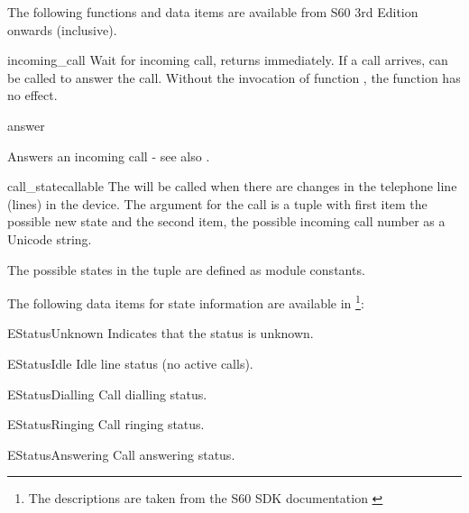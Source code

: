\begin{notice}[note]
The following functions and data items are available from S60 3rd Edition 
onwards (inclusive).
\end{notice}

\begin{funcdesc}{incoming_call}{}
Wait for incoming call, returns immediately. If a call arrives,  
can be called to answer the call. Without the invocation of function 
, the function  has no effect.
\end{funcdesc}

\begin{funcdesc}{answer}{}

Answers an incoming call - see also . 

\end{funcdesc}

\begin{funcdesc}{call_state}{callable}
The  will be called when there are changes in the telephone line 
(lines) in the device. The argument for the call is a tuple with first item the 
possible new state and the second item, the possible incoming call number as a 
Unicode string.

The possible states in the tuple are defined as  module 
constants.
\end{funcdesc}

The following data items for state information are available in 
\footnote{The descriptions are taken from the S60 SDK 
documentation \cite{S60Doc}}:

\begin{datadesc}{EStatusUnknown}
Indicates that the status is unknown.
\end{datadesc}

\begin{datadesc}{EStatusIdle}
Idle line status (no active calls).
\end{datadesc}

\begin{datadesc}{EStatusDialling}
Call dialling status.
\end{datadesc}

\begin{datadesc}{EStatusRinging}
Call ringing status.
\end{datadesc}

\begin{datadesc}{EStatusAnswering}
Call answering status.
\end{datadesc}

